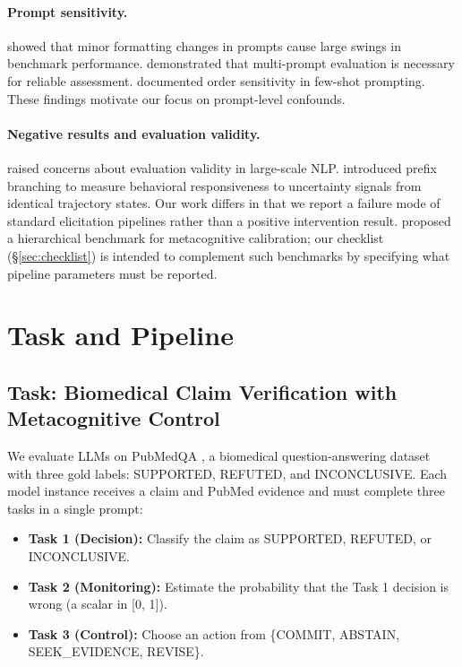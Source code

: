 \documentclass[11pt]{article}
\begin{document}
\paragraph{Prompt sensitivity.} \citet{sclar2024quantifying} showed that minor formatting changes in prompts cause large swings in benchmark performance. \citet{mizrahi2024state} demonstrated that multi-prompt evaluation is necessary for reliable assessment. \citet{lu2021fantastically} documented order sensitivity in few-shot prompting. These findings motivate our focus on prompt-level confounds.

\paragraph{Negative results and evaluation validity.} \citet{bender2021dangers} raised concerns about evaluation validity in large-scale NLP. \citet{zhang2026calibration} introduced prefix branching to measure behavioral responsiveness to uncertainty signals from identical trajectory states. Our work differs in that we report a failure mode of standard elicitation pipelines rather than a positive intervention result. \citet{wang2026mirror} proposed a hierarchical benchmark for metacognitive calibration; our checklist (\S\ref{sec:checklist}) is intended to complement such benchmarks by specifying what pipeline parameters must be reported.

\section{Task and Pipeline}

\subsection{Task: Biomedical Claim Verification with Metacognitive Control}

We evaluate LLMs on PubMedQA \cite{jin2019pubmedqa}, a biomedical question-answering dataset with three gold labels: SUPPORTED, REFUTED, and INCONCLUSIVE. Each model instance receives a claim and PubMed evidence and must complete three tasks in a single prompt:

\begin{itemize}
    \item \textbf{Task 1 (Decision):} Classify the claim as SUPPORTED, REFUTED, or INCONCLUSIVE.
    \item \textbf{Task 2 (Monitoring):} Estimate the probability that the Task 1 decision is wrong (a scalar in [0, 1]).
    \item \textbf{Task 3 (Control):} Choose an action from \{COMMIT, ABSTAIN, SEEK\_EVIDENCE, REVISE\}.
\end{itemize}
\end{document}
